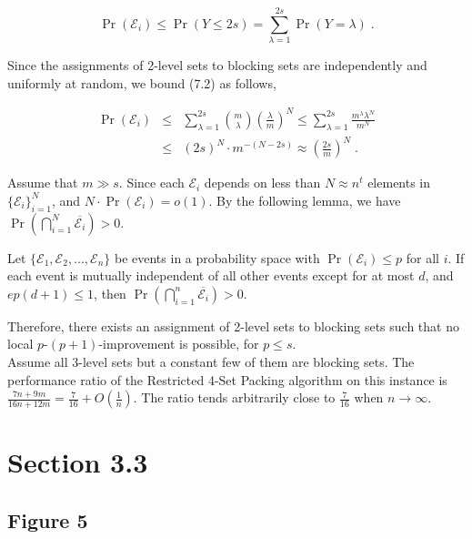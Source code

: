 \documentclass[runningheads,a4paper]{llncs}
\numberwithin{equation}{section}
\begin{document}
\begin{equation}
\Pr(\mathcal{E}_i)\leq \Pr(Y\leq 2s)=\sum_{\lambda=1}^{2s} \Pr(Y=\lambda) \; .
\end{equation}

Since the assignments of 2-level sets to blocking sets are independently and uniformly at random, we bound (7.2) as follows,

\begin{eqnarray}
\Pr(\mathcal{E}_i) &\leq& \sum_{\lambda=1}^{2s}{m\choose\lambda}(\frac{\lambda}{m})^N \leq \sum_{\lambda=1}^{2s} \frac{m^{\lambda}\lambda^N}{m^N} \nonumber \\
&\leq& (2s)^N\cdot m^{-(N-2s)}\approx (\frac{2s}{m})^{N} \; .
\end{eqnarray}

Assume that $m\gg s$. Since each $\mathcal{E}_i$ depends on less than $N\approx n^t$ elements in $\{\mathcal{E}_i\}_{i=1}^N$, and $N\cdot \Pr(\mathcal{E}_i)=o(1)$. By the following lemma, we have $\Pr(\bigcap_{i=1}^N \overline{\mathcal{E}_i})>0$.

\begin{lemma}
Let $\{\mathcal{E}_1,\mathcal{E}_2,...,\mathcal{E}_n\}$ be events in a probability space with $\Pr(\mathcal{E}_i)\leq p$ for all $i$. If each event is mutually independent of all other events except for at most $d$, and $ep(d+1)\leq 1$, then $\Pr(\bigcap_{i=1}^n \overline{\mathcal{E}_i})>0$.
\end{lemma}

Therefore, there exists an assignment of 2-level sets to blocking sets such that no local $p$-$(p+1)$-improvement is possible, for $p\leq s$. \\

Assume all 3-level sets but a constant few of them are blocking sets. The performance ratio of the Restricted 4-Set Packing algorithm on this instance is $\frac{7n+9m}{16n+12m}=\frac{7}{16}+O(\frac{1}{n})$. The ratio tends arbitrarily close to $\frac{7}{16}$ when $n\rightarrow \infty$.



\section{Section 3.3}

\subsection{Figure 5}
\end{document}
